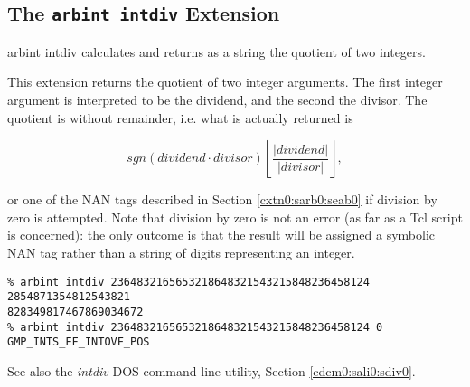 \subsection{The \texttt{arbint intdiv} Extension}
\label{cxtn0:sarb0:sdiv0}

\begin{tclcommandname}{arbint intdiv}%
calculates and returns as a string the quotient of two integers.
\end{tclcommandname}

\begin{tclcommandsynopsis}
\end{tclcommandsynopsis}

\begin{tclcommanddescription}
This extension returns the quotient of two integer arguments.
The first integer argument is interpreted to be the dividend,
and the second the divisor.  The quotient is without remainder,
i.e. what is actually returned is

\begin{equation}
sgn(dividend \cdot divisor) 
\left\lfloor{\frac{|dividend|}{|divisor|}}\right\rfloor ,
\end{equation}

or one of the NAN tags described in
Section \ref{cxtn0:sarb0:seab0}
if division by zero is attempted.  Note that division
by zero is not an error (as far as a Tcl script is concerned):
the only outcome is that the result will be assigned a symbolic
NAN tag rather than a string of digits representing an integer.
\end{tclcommanddescription}

\begin{tclcommandsampleinvocations}
\begin{scriptsize}
\begin{verbatim}
% arbint intdiv 2364832165653218648321543215848236458124 2854871354812543821
828349817467869034672
% arbint intdiv 2364832165653218648321543215848236458124 0
GMP_INTS_EF_INTOVF_POS
\end{verbatim}
\end{scriptsize}
\end{tclcommandsampleinvocations}

\begin{tclcommandseealso}
See also the \emph{intdiv} DOS command-line utility, 
Section \cdcmzeroxrefhyphen{}\ref{cdcm0:sali0:sdiv0}.
\end{tclcommandseealso}


